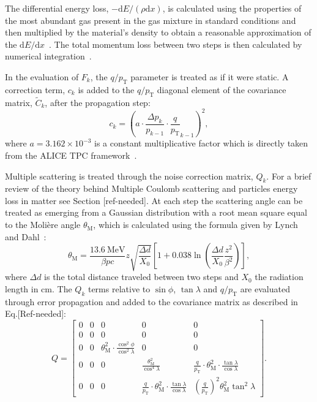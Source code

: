 The differential energy loss, $-\textrm{d}E/\left(\rho\textrm{d}x\right)$, is calculated using the properties of the most abundant gas present in the gas mixture in standard conditions and then multiplied by the material's density to obtain a reasonable approximation of the $\textrm{d}E/\textrm{d}x$~\cite{STERNHEIMER1984261}. The total momentum loss between two steps is then calculated by numerical integration~\cite{Griffiths2010}. 

In the evaluation of $F_k$, the $q/p_{\text{T}}$ parameter is treated as if it were static. A correction term, $c_k$ is added to the $q/p_{\text{T}}$ diagonal element of the covariance matrix, $\widetilde{C}_k$, after the propagation step:
\begin{equation} \label{eq:eloss-factor}
    c_k=\left(a\cdot\frac{\Delta p_k}{p_{k-1}} \cdot\frac{q}{p_{\text{T}}}_{k-1}\right)^2,
\end{equation}
where $a=3.162\times 10^{-3}$ is a constant multiplicative factor which is directly taken from the ALICE TPC framework~\cite{carminati2003simulation}.

Multiple scattering is treated through the noise correction matrix, $Q_k$. For a brief review of the theory behind Multiple Coulomb scattering and particles energy loss in matter see Section [ref-needed]. At each step the scattering angle can be treated as emerging from a Gaussian distribution with a root mean square equal to the Molière angle $\theta_{\textrm{M}}$, which is calculated using the formula given by Lynch and Dahl~\cite{LYNCH19916}:
\begin{equation}
    \theta_{\textrm{M}} = \frac{13.6 \ \text{MeV}}{\beta pc}z\sqrt{\frac{\Delta d}{X_0}} \left[ 1+0.038\ln{\left(\frac{\Delta d}{X_0 }\frac{z^2}{\beta^2}\right)}\right], 
\end{equation}
where $\Delta d$ is the total distance traveled between two steps and $X_0$ the radiation length in cm. The $Q_k$ terms relative to $\sin \phi$, $\tan \lambda$ and $q/p_{\text{T}}$ are evaluated through error propagation and added to the covariance matrix as described in Eq.[Ref-needed]:
\begin{equation}\label{eq:Q}
    Q =\begin{bmatrix}
    0 & 0 & 0 & 0& 0 \\
    0 & 0 & 0 & 0& 0 \\
    0 & 0 & \theta_{\textrm{M}}^2\cdot\frac{\cos^{2}\phi}{\cos^{2}\lambda} & 0& 0 \\
    0 & 0 & 0 & \frac{\theta^2_{\textrm{M}}}{\cos^4\lambda}& \frac{q}{p_{\text{T}}}\cdot\theta^2_{\textrm{M}}\cdot\frac{\tan\lambda}{\cos\lambda} \\
    0 & 0 & 0 & \frac{q}{p_{\text{T}}}\cdot\theta^2_{\textrm{M}}\cdot\frac{\tan\lambda}{\cos\lambda}& \left(\frac{q}{p_{\textrm{T}}}\right)^2\theta^2_{\textrm{M}} \tan^2\lambda
    \end{bmatrix} .
\end{equation}

